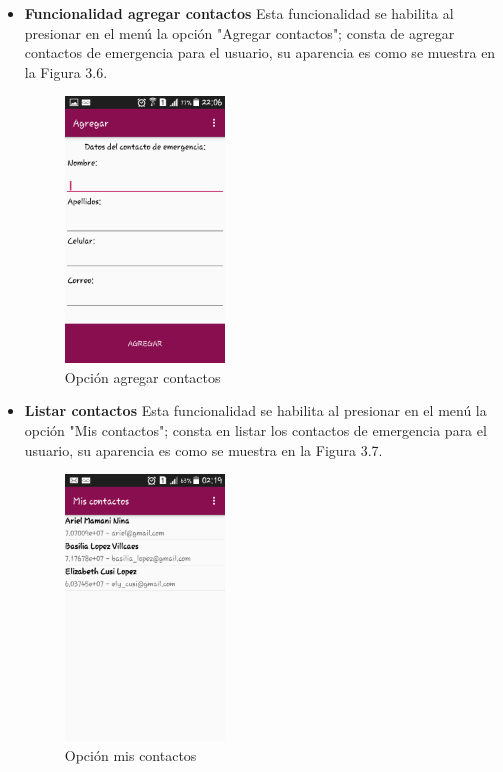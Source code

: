 \begin{itemize}
\item \textbf{Funcionalidad agregar contactos}
Esta funcionalidad se habilita al presionar en el menú la opción "Agregar contactos"; consta de agregar contactos de emergencia para el usuario, su aparencia es como se muestra en la Figura 3.6.
\begin{figure}[h!]
  \begin{center}	\includegraphics[width=0.4\textwidth]{imagenes/agregar}
  \caption{Opción agregar contactos}
  \end{center}
\end{figure}
\item \textbf{Listar contactos}
Esta funcionalidad se habilita al presionar en el menú la opción "Mis contactos"; consta en listar los contactos de emergencia para el usuario, su aparencia es como se muestra en la Figura 3.7.
\begin{figure}[h!]
  \begin{center}	\includegraphics[width=0.4\textwidth]{imagenes/lista}
  \caption{Opción mis contactos}
  \end{center}
\end{figure}
\end{itemize}